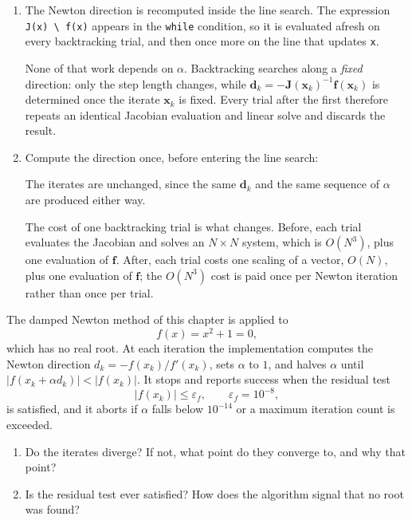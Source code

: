 \begin{solution}
    
    \begin{enumerate}[label=(\alph*)]
        \item The Newton direction is recomputed inside the line search. The expression \texttt{J(x) \textbackslash\ f(x)} appears in the \texttt{while} condition, so it is evaluated afresh on every backtracking trial, and then once more on the line that updates \texttt{x}.

        None of that work depends on $\alpha$. Backtracking searches along a \emph{fixed} direction: only the step length changes, while $\mathbf{d}_k = -\mathbf{J}(\mathbf{x}_k)^{-1}\mathbf{f}(\mathbf{x}_k)$ is determined once the iterate $\mathbf{x}_k$ is fixed. Every trial after the first therefore repeats an identical Jacobian evaluation and linear solve and discards the result.
        \item Compute the direction once, before entering the line search:
        
        The iterates are unchanged, since the same $\mathbf{d}_k$ and the same sequence of $\alpha$ are produced either way.

        The cost of one backtracking trial is what changes. Before, each trial evaluates the Jacobian and solves an $N \times N$ system, which is $O(N^3)$, plus one evaluation of $\mathbf{f}$. After, each trial costs one scaling of a vector, $O(N)$, plus one evaluation of $\mathbf{f}$; the  $O(N^3)$ cost is paid once per Newton iteration rather than once per trial.

    \end{enumerate}
    
\end{solution}


\begin{exercise} %
    
    The damped Newton method of this chapter is applied to
    \[
        f(x) = x^2 + 1 = 0,
    \]
    which has no real root. At each iteration the implementation computes the Newton direction $d_k = -f(x_k)/f'(x_k)$, sets $\alpha$ to $1$, and halves $\alpha$ until $|f(x_k + \alpha d_k)| < |f(x_k)|$. It stops and reports success when the residual test
    \[
        |f(x_k)| \le \varepsilon_f, \qquad \varepsilon_f = 10^{-8},
    \]
    is satisfied, and it aborts if $\alpha$ falls below $10^{-14}$ or a maximum iteration count is exceeded.
    \begin{enumerate}[label=(\alph*)]
        \item Do the iterates diverge? If not, what point do they converge to, and why that point?
        \item Is the residual test ever satisfied? How does the algorithm signal that no root was found?
    \end{enumerate}
    
\end{exercise}

